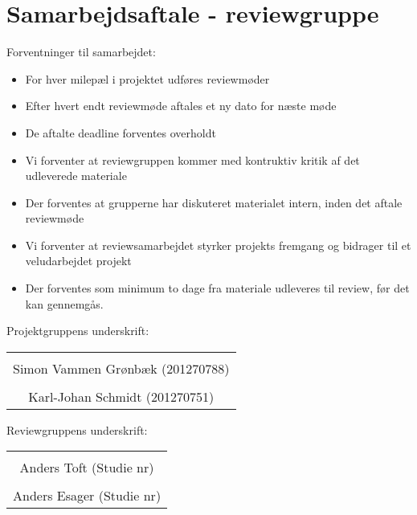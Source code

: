 \section{Samarbejdsaftale - reviewgruppe}

Forventninger til samarbejdet:
\begin{itemize}
	\item For hver milepæl i projektet udføres reviewmøder
	\item Efter hvert endt reviewmøde aftales et ny dato for næste møde
	\item De aftalte deadline forventes overholdt
	\item Vi forventer at reviewgruppen kommer med kontruktiv kritik af det udleverede materiale
	\item Der forventes at grupperne har diskuteret materialet intern, inden det aftale reviewmøde
	\item Vi forventer at reviewsamarbejdet styrker projekts fremgang og bidrager til et veludarbejdet projekt
	\item Der forventes som minimum to dage fra materiale udleveres til review, før det kan gennemgås. 
\end{itemize}


Projektgruppens underskrift: 
\begin{table}[H]
	\centering
	\begin{tabular}{c}
		\underline{\phantom{mmmmmmmmmmmmmm}}  \\
		Simon Vammen Grønbæk (201270788) \vspace{2cm}\\
		\underline{\phantom{mmmmmmmmmmmmmm}} \\
		Karl-Johan Schmidt (201270751)\vspace{2cm}	\\
	\end{tabular}
\end{table}

Reviewgruppens underskrift:

\begin{table}[H]
	\centering
	\begin{tabular}{c}
		\underline{\phantom{mmmmmmmmmmmmmm}}  \\
		Anders Toft (Studie nr) \vspace{2cm}\\
		\underline{\phantom{mmmmmmmmmmmmmm}} \\
		Anders Esager (Studie nr)\vspace{2cm}	\\
	\end{tabular}
\end{table}
